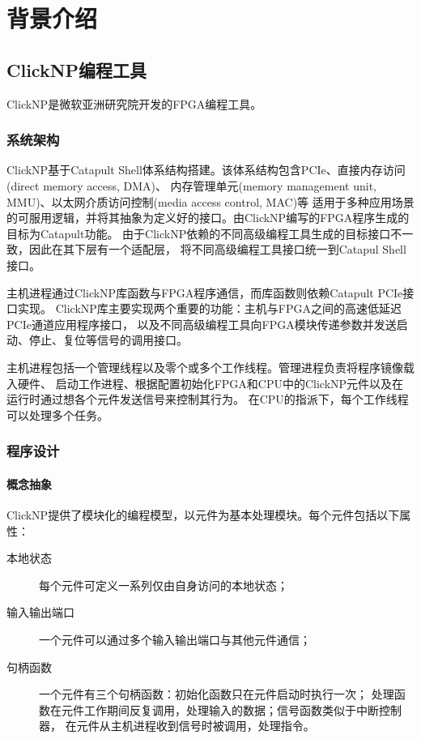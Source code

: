 \chapter{背景介绍}
\section{ClickNP编程工具}
ClickNP是微软亚洲研究院开发的FPGA编程工具\cite{clicknp}。
\subsection{系统架构}
ClickNP基于Catapult Shell体系结构\cite{6853195}搭建。该体系结构包含PCIe、直接内存访问(direct memory access, DMA)、
内存管理单元(memory management unit, MMU)、以太网介质访问控制(media access control, MAC)等
适用于多种应用场景的可服用逻辑，并将其抽象为定义好的接口。由ClickNP编写的FPGA程序生成的目标为Catapult功能。
由于ClickNP依赖的不同高级编程工具生成的目标接口不一致，因此在其下层有一个适配层，
将不同高级编程工具接口统一到Catapul Shell接口。

主机进程通过ClickNP库函数与FPGA程序通信，而库函数则依赖Catapult PCIe接口实现。
ClickNP库主要实现两个重要的功能：主机与FPGA之间的高速低延迟PCIe通道应用程序接口，
以及不同高级编程工具向FPGA模块传递参数并发送启动、停止、复位等信号的调用接口。

主机进程包括一个管理线程以及零个或多个工作线程。管理进程负责将程序镜像载入硬件、
启动工作进程、根据配置初始化FPGA和CPU中的ClickNP元件以及在运行时通过想各个元件发送信号来控制其行为。
在CPU的指派下，每个工作线程可以处理多个任务。

\subsection{程序设计}
\subsubsection{概念抽象}
ClickNP提供了模块化的编程模型，以元件为基本处理模块。每个元件包括以下属性：
\begin{description}
\item[本地状态]每个元件可定义一系列仅由自身访问的本地状态；
\item[输入输出端口]一个元件可以通过多个输入输出端口与其他元件通信；
\item[句柄函数]一个元件有三个句柄函数：初始化函数只在元件启动时执行一次；
处理函数在元件工作期间反复调用，处理输入的数据；信号函数类似于中断控制器，
在元件从主机进程收到信号时被调用，处理指令。
\end{description}

